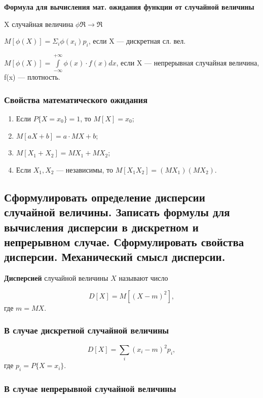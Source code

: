\textbf{Формула для вычисления мат. ожидания функции от случайной величины}

X случайная величина $\phi \Re \rightarrow \Re$ 

$M[\phi(X)] = \Sigma_i\phi(x_i)p_i$, если X --- дискретная сл. вел.

$M[\phi(X)] = \int\limits_{-\infty}^{+\infty} \phi(x) \cdot f(x)dx$, если X --- непрерывная случайная величина, f(x) --- плотность.

\subsubsection*{Свойства математического ожидания}

\begin{enumerate}
	\item Если $P\{X = x_{0}\} = 1$, то $M[X] = x_0$;
	\item $M[aX + b] = a \cdot MX + b$;
	\item $M[X_{1} + X_{2}] = MX_{1} + MX_{2}$;
	\item Если $X_{1}, X_{2}$ --- независимы, то $M[X_{1}X_{2}] = (MX_{1})(MX_{2})$.
\end{enumerate}

\subsection{Сформулировать определение дисперсии случайной величины. Записать формулы для вычисления дисперсии в дискретном и непрерывном случае. Сформулировать свойства дисперсии. Механический смысл дисперсии.}

\textbf{Дисперсией} случайной величины $X$ называют число

\begin{equation}
	D[X] = M[(X - m)^{2}],
\end{equation}
где $m = MX$.

\subsubsection*{В случае дискретной случайной величины}

\begin{equation}
	D[X] = \sum_{i}(x_{i} - m)^{2}p_{i},
\end{equation}
где $p_{i} = P\{X = x_{i}\}$.

\subsubsection*{В случае непрерывной случайной величины}

